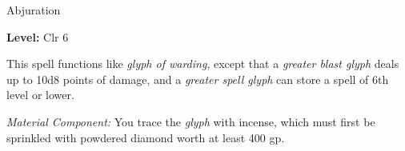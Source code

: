 \label{spell:Greater Glyph of Warding}

Abjuration

\textbf{Level:} Clr 6

This spell functions like \textit{glyph of warding}, except that a \textit{greater 
blast glyph} deals up to 10d8 points of damage, and a \textit{greater spell glyph 
}can store a spell of 6th level or lower.

\textit{Material Component:} You trace the \textit{glyph} with incense, which must 
first be sprinkled with powdered diamond worth at least 400 gp.

